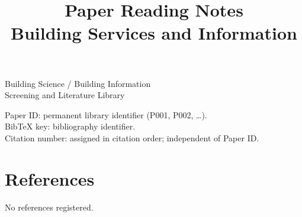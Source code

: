 \documentclass[a4paper,11pt,nomag,dvipdfmx]{jsarticle}
\title{Paper Reading Notes\\[1em]\large Building Services and Information}
\author{}
\date{}
\begin{document}
\begin{titlepage}
\maketitle
\thispagestyle{empty}
\begin{center}
Building Science / Building Information\\
Screening and Literature Library
\end{center}
\vfill
\noindent Paper ID: permanent library identifier (P001, P002, \ldots).\\
BibTeX key: bibliography identifier.\\
Citation number: assigned in citation order; independent of Paper ID.
\end{titlepage}
\tableofcontents
\clearpage

\clearpage

\clearpage

\clearpage

\clearpage

\clearpage

\clearpage

\clearpage

\clearpage

\clearpage

\clearpage

\clearpage

\clearpage

\clearpage


\ifdefined\LibraryHasPapers
  
\else
  \section*{References}
  No references registered.
\fi
\end{document}
